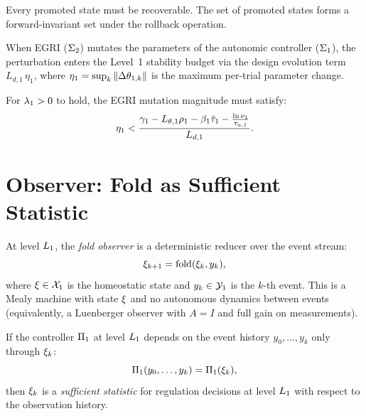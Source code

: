 \documentclass[11pt,a4paper]{article}
\begin{document}
\begin{law}
Every promoted state must be recoverable.  The set of promoted states forms
a forward-invariant set under the rollback operation.
\end{law}

\begin{proposition}
\label{prop:egri-coupling}
When EGRI ($\Sigma_2$) mutates the parameters of the autonomic controller
($\Sigma_1$), the perturbation enters the Level~1 stability budget
via the design evolution term $L_{d,1} \, \eta_1$, where
$\eta_1 = \sup_k \left\| \Delta \theta_{1,k} \right\|$ is the maximum per-trial
parameter change.

For $\lambda_1 > 0$ to hold, the EGRI mutation magnitude must satisfy:
\begin{equation}
  \eta_1 < \frac{\decay_1 - L_{\param,1}\rho_1 - \beta_1\taubar_1
  - \frac{\ln\nu_1}{\taua[1]}}{L_{d,1}}.
\end{equation}
\end{proposition}


\section{Observer: Fold as Sufficient Statistic}
\label{sec:observer}

\begin{definition}
\label{def:fold}
At level $L_{1}$, the \emph{fold observer} is a deterministic reducer over
the event stream:
\begin{equation}
  \xi_{k+1} = \text{fold}(\xi_k, y_k),
\end{equation}
where $\xi \in \mathcal{X}_1$ is the homeostatic state and $y_k \in \mathcal{Y}_1$ is
the $k$-th event.  This is a Mealy machine with state $\xi$ and no
autonomous dynamics between events (equivalently, a Luenberger observer with
$A = I$ and full gain on measurements).
\end{definition}

\begin{proposition}[Sufficiency]
\label{prop:sufficient}
If the controller $\Pi_1$ at level $L_{1}$ depends on the event history
$y_0, \ldots, y_k$ only through $\xi_k$:
\begin{equation}
  \Pi_1(y_0, \ldots, y_k) = \Pi_1(\xi_k),
\end{equation}
then $\xi_k$ is a \emph{sufficient statistic} for regulation decisions
at level $L_{1}$ with respect to the observation history.
\end{proposition}
\end{document}
